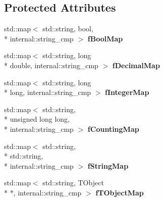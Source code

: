 \subsection*{Protected Attributes}
\begin{DoxyCompactItemize}
\item 
\hypertarget{class_h_a_l_1_1_analysis_data_adc7232f1a112de23d2b557740422ec9f}{std\+::map$<$ std\+::string, bool, \\*
internal\+::string\+\_\+cmp $>$ {\bfseries f\+Bool\+Map}}\label{class_h_a_l_1_1_analysis_data_adc7232f1a112de23d2b557740422ec9f}

\item 
\hypertarget{class_h_a_l_1_1_analysis_data_a79170e31902d40d73d6838b816e74dc8}{std\+::map$<$ std\+::string, long \\*
double, internal\+::string\+\_\+cmp $>$ {\bfseries f\+Decimal\+Map}}\label{class_h_a_l_1_1_analysis_data_a79170e31902d40d73d6838b816e74dc8}

\item 
\hypertarget{class_h_a_l_1_1_analysis_data_a5487671b851b8ce89298d7f770ab8f34}{std\+::map$<$ std\+::string, long \\*
long, internal\+::string\+\_\+cmp $>$ {\bfseries f\+Integer\+Map}}\label{class_h_a_l_1_1_analysis_data_a5487671b851b8ce89298d7f770ab8f34}

\item 
\hypertarget{class_h_a_l_1_1_analysis_data_a6f29542f7f2cd7e7377c56ac54592dd5}{std\+::map$<$ std\+::string, \\*
unsigned long long, \\*
internal\+::string\+\_\+cmp $>$ {\bfseries f\+Counting\+Map}}\label{class_h_a_l_1_1_analysis_data_a6f29542f7f2cd7e7377c56ac54592dd5}

\item 
\hypertarget{class_h_a_l_1_1_analysis_data_a3256b3efc77655ba25cc34a6986c00d5}{std\+::map$<$ std\+::string, \\*
std\+::string, \\*
internal\+::string\+\_\+cmp $>$ {\bfseries f\+String\+Map}}\label{class_h_a_l_1_1_analysis_data_a3256b3efc77655ba25cc34a6986c00d5}

\item 
\hypertarget{class_h_a_l_1_1_analysis_data_a913d66198c57cc2bd9f0e3e5d904e33f}{std\+::map$<$ std\+::string, T\+Object \\*
$\ast$, internal\+::string\+\_\+cmp $>$ {\bfseries f\+T\+Object\+Map}}\label{class_h_a_l_1_1_analysis_data_a913d66198c57cc2bd9f0e3e5d904e33f}


\end{DoxyCompactItemize}
